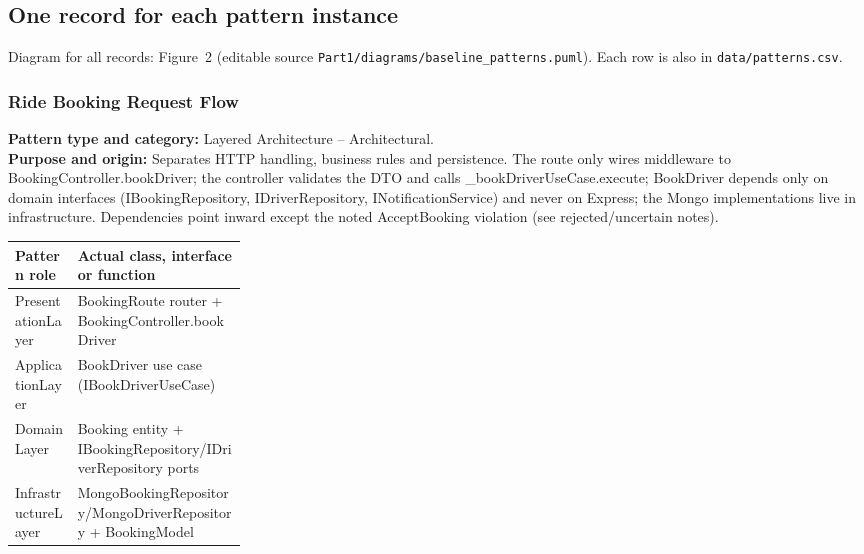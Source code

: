 \documentclass[11pt,a4paper]{article}
\begin{document}
\subsection{One record for each pattern instance}
Diagram for all records: Figure~2 (editable source \texttt{Part1/diagrams/baseline\_patterns.puml}). Each row is also in \texttt{data/patterns.csv}.

\subsubsection*{Ride Booking Request Flow}
\textbf{Pattern type and category:} Layered Architecture -- Architectural.\\
\textbf{Purpose and origin:} Separates HTTP handling, business rules and persistence. The route only wires middleware to BookingController.bookDriver; the controller validates the DTO and calls \_bookDriverUseCase.execute; BookDriver depends only on domain interfaces (IBookingRepository, IDriverRepository, INotificationService) and never on Express; the Mongo implementations live in infrastructure. Dependencies point inward except the noted AcceptBooking violation (see rejected/uncertain notes).

\noindent\begin{tabularx}{\linewidth}{@{}P{0.27\linewidth}Y@{}}
\toprule Pattern role & Actual class, interface or function \\ \midrule
PresentationLayer & BookingRoute router + BookingController.bookDriver \\
ApplicationLayer & BookDriver use case (IBookDriverUseCase) \\
DomainLayer & Booking entity + IBookingRepository/IDriverRepository ports \\
InfrastructureLayer & MongoBookingRepository/MongoDriverRepository + BookingModel \\
\bottomrule
\end{tabularx}
\end{document}
